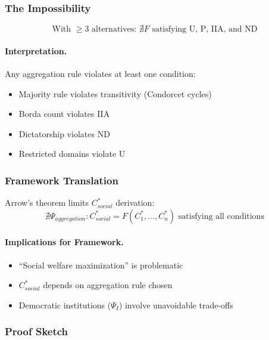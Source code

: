 \subsubsection{The Impossibility}

\begin{equation}
\boxed{
\text{With } \geq 3 \text{ alternatives: } \nexists F \text{ satisfying U, P, IIA, and ND}
}
\label{eq:arrow}
\end{equation}

\paragraph{Interpretation.}
Any aggregation rule violates at least one condition:
\begin{itemize}
    \item Majority rule violates transitivity (Condorcet cycles)
    \item Borda count violates IIA
    \item Dictatorship violates ND
    \item Restricted domains violate U
\end{itemize}

\subsubsection{Framework Translation}

Arrow's theorem limits $C^*_{social}$ derivation:
\begin{equation}
\nexists \Psi_{aggregation}: C^*_{social} = F(C^*_1, \ldots, C^*_n) \text{ satisfying all conditions}
\end{equation}

\paragraph{Implications for Framework.}
\begin{itemize}
    \item ``Social welfare maximization'' is problematic
    \item $C^*_{social}$ depends on aggregation rule chosen
    \item Democratic institutions ($\Psi_I$) involve unavoidable trade-offs
\end{itemize}

\subsubsection{Proof Sketch}

